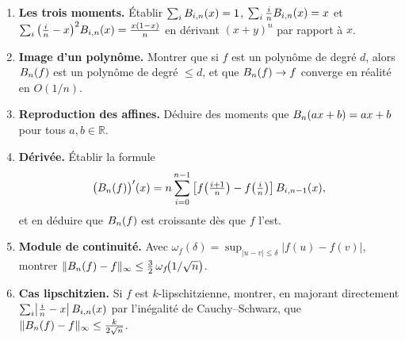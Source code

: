 \begin{mdframed}[style=exobar]
  \begin{enumerate}
    \item \textbf{Les trois moments.} Établir
          $\sum_i B_{i,n}(x)=1$, $\sum_i \tfrac{i}{n}B_{i,n}(x)=x$ et
          $\sum_i {\left(\tfrac{i}{n}-x\right)}^2B_{i,n}(x)=\tfrac{x(1-x)}{n}$
          en dérivant ${(x+y)}^n$ par rapport à $x$.

    \item \textbf{Image d'un polynôme.} Montrer que si $f$ est un polynôme de
          degré $d$, alors $B_n(f)$ est un polynôme de degré $\leq d$, et que
          $B_n(f)\to f$ converge en réalité en $O(1/n)$.

    \item \textbf{Reproduction des affines.} Déduire des moments que
          $B_n(ax+b)=ax+b$ pour tous $a,b\in\mathbb{R}$.

    \item \textbf{Dérivée.} Établir la formule
          \[
            {\bigl(B_n(f)\bigr)}'(x) = n\sum_{i=0}^{n-1}
              \left[f\!\left(\tfrac{i+1}{n}\right)-f\!\left(\tfrac{i}{n}\right)\right]
              B_{i,n-1}(x),
          \]
          et en déduire que $B_n(f)$ est croissante dès que $f$ l'est.

    \item \textbf{Module de continuité.} Avec $\omega_f(\delta)
          =\sup_{|u-v|\leq\delta}|f(u)-f(v)|$, montrer
          $\|B_n(f)-f\|_\infty \leq \tfrac{3}{2}\,\omega_f\!\bigl(1/\sqrt{n}\bigr)$.

    \item \textbf{Cas lipschitzien.} Si $f$ est $k$-lipschitzienne, montrer,
          en majorant directement $\sum_i \bigl|\tfrac{i}{n}-x\bigr|\,B_{i,n}(x)$
          par l'inégalité de Cauchy--Schwarz, que
          $\|B_n(f)-f\|_\infty \leq \tfrac{k}{2\sqrt{n}}$.
  \end{enumerate}
\end{mdframed}


